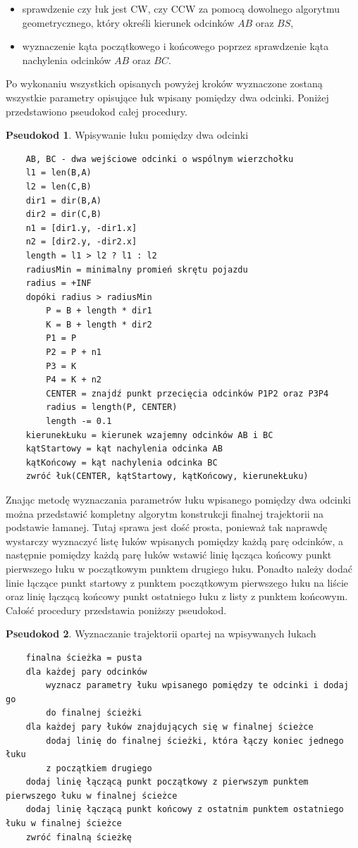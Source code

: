 \documentclass[a4paper,11pt,twoside]{report}
\theoremstyle{definition}
\newtheorem{pseudokod}{Pseudokod}[subsection]
\begin{document}
\begin{itemize}
	\item sprawdzenie czy łuk jest CW, czy CCW za pomocą dowolnego algorytmu geometrycznego, który określi kierunek odcinków $AB$ oraz $BS$,
	\item wyznaczenie kąta początkowego i końcowego poprzez sprawdzenie kąta nachylenia odcinków $AB$ oraz $BC$.

\end{itemize}

Po wykonaniu wszystkich opisanych powyżej kroków wyznaczone zostaną wszystkie parametry opisujące łuk wpisany pomiędzy dwa odcinki. Poniżej przedstawiono pseudokod całej procedury.

\begin{pseudokod}
Wpisywanie łuku pomiędzy dwa odcinki
\begin{verbatim}
    AB, BC - dwa wejściowe odcinki o wspólnym wierzchołku
    l1 = len(B,A)
    l2 = len(C,B)
    dir1 = dir(B,A)
    dir2 = dir(C,B)
    n1 = [dir1.y, -dir1.x]
    n2 = [dir2.y, -dir2.x]
    length = l1 > l2 ? l1 : l2
    radiusMin = minimalny promień skrętu pojazdu
    radius = +INF
    dopóki radius > radiusMin
        P = B + length * dir1
        K = B + length * dir2
        P1 = P
        P2 = P + n1
        P3 = K
        P4 = K + n2
        CENTER = znajdź punkt przecięcia odcinków P1P2 oraz P3P4
        radius = length(P, CENTER)  
        length -= 0.1
    kierunekŁuku = kierunek wzajemny odcinków AB i BC
    kątStartowy = kąt nachylenia odcinka AB
    kątKońcowy = kąt nachylenia odcinka BC
    zwróć łuk(CENTER, kątStartowy, kątKońcowy, kierunekŁuku)
\end{verbatim}
\end{pseudokod}

Znając metodę wyznaczania parametrów łuku wpisanego pomiędzy dwa odcinki można przedstawić kompletny algorytm konstrukcji finalnej trajektorii na podstawie łamanej. Tutaj sprawa jest dość prosta, ponieważ tak naprawdę wystarczy wyznaczyć listę łuków wpisanych pomiędzy każdą parę odcinków, a następnie pomiędzy każdą parę łuków wstawić linię łącząca końcowy punkt pierwszego łuku w początkowym punktem drugiego łuku. Ponadto należy dodać linie łączące punkt startowy z punktem początkowym pierwszego łuku na liście oraz linię łączącą końcowy punkt ostatniego łuku z listy z punktem końcowym. Całość procedury przedstawia poniższy pseudokod.

\begin{pseudokod}
Wyznaczanie trajektorii opartej na wpisywanych łukach
\begin{verbatim}
    finalna ścieżka = pusta
    dla każdej pary odcinków
        wyznacz parametry łuku wpisanego pomiędzy te odcinki i dodaj go 
        do finalnej ścieżki
    dla każdej pary łuków znajdujących się w finalnej ścieżce
        dodaj linię do finalnej ścieżki, która łączy koniec jednego łuku 
        z początkiem drugiego
    dodaj linię łączącą punkt początkowy z pierwszym punktem pierwszego łuku w finalnej ścieżce
    dodaj linię łączącą punkt końcowy z ostatnim punktem ostatniego łuku w finalnej ścieżce
    zwróć finalną ścieżkę
\end{verbatim}
\end{pseudokod}
\end{document}
